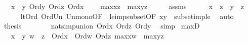 \begin{isabellebody}
\ \ \ {\isachardoublequoteopen}x\ {\isasymle}\ y{\isachardoublequoteclose}\ {\isachardoublequoteopen}Ord{\isacharparenleft}{\kern0pt}y{\isacharparenright}{\kern0pt}{\isachardoublequoteclose}\ {\isachardoublequoteopen}Ord{\isacharparenleft}{\kern0pt}z{\isacharparenright}{\kern0pt}{\isachardoublequoteclose}\ {\isachardoublequoteopen}Ord{\isacharparenleft}{\kern0pt}x{\isacharparenright}{\kern0pt}{\isachardoublequoteclose}\ \isanewline
\ \ \ {\isachardoublequoteopen}max{\isacharparenleft}{\kern0pt}x{\isacharcomma}{\kern0pt}z{\isacharparenright}{\kern0pt}\ {\isasymle}\ max{\isacharparenleft}{\kern0pt}y{\isacharcomma}{\kern0pt}z{\isacharparenright}{\kern0pt}{\isachardoublequoteclose}\isanewline
%
\isadelimproof
%
\endisadelimproof
%
\isatagproof
{}\isamarkupfalse%
\ {\isacharminus}{\kern0pt}\isanewline
\ \ \isamarkupfalse%
\ assms\ \isanewline
\ \ \isamarkupfalse%
\ {\isachardoublequoteopen}\ x\ {\isasymunion}\ z\ {\isasymle}\ y\ {\isasymunion}\ z{\isachardoublequoteclose}\isanewline
\ \ \ \ \isamarkupfalse%
\ lt{\isacharunderscore}{\kern0pt}Ord\ Ord{\isacharunderscore}{\kern0pt}Un\ Un{\isacharunderscore}{\kern0pt}mono{\isacharbrackleft}{\kern0pt}OF\ \ le{\isacharunderscore}{\kern0pt}imp{\isacharunderscore}{\kern0pt}subset{\isacharbrackleft}{\kern0pt}OF\ {\isacartoucheopen}x{\isasymle}y{\isacartoucheclose}{\isacharbrackright}{\kern0pt}{\isacharbrackright}{\kern0pt}\ \ subset{\isacharunderscore}{\kern0pt}imp{\isacharunderscore}{\kern0pt}le\ \isamarkupfalse%
\ auto\isanewline
\ \ \isamarkupfalse%
\ \isamarkupfalse%
\ {\isacharquery}{\kern0pt}thesis\ \isanewline
\ \ \ \ \isamarkupfalse%
\ \ nat{\isacharunderscore}{\kern0pt}simp{\isacharunderscore}{\kern0pt}union\ {\isacartoucheopen}Ord{\isacharparenleft}{\kern0pt}x{\isacharparenright}{\kern0pt}{\isacartoucheclose}\ {\isacartoucheopen}Ord{\isacharparenleft}{\kern0pt}z{\isacharparenright}{\kern0pt}{\isacartoucheclose}\ {\isacartoucheopen}Ord{\isacharparenleft}{\kern0pt}y{\isacharparenright}{\kern0pt}{\isacartoucheclose}\ \isamarkupfalse%
\ simp\isanewline
{}\isamarkupfalse%
%
\endisatagproof
{\isafoldproof}%
%
\isadelimproof
\isanewline
%
\endisadelimproof
\isanewline
{}\isamarkupfalse%
\ max{\isacharunderscore}{\kern0pt}D{}\ {\isacharcolon}{\kern0pt}\isanewline
\ \ \ {\isachardoublequoteopen}x\ {\isacharequal}{\kern0pt}\ y{\isachardoublequoteclose}\ {\isachardoublequoteopen}w\ {\isacharless}{\kern0pt}\ z{\isachardoublequoteclose}\ \ {\isachardoublequoteopen}Ord{\isacharparenleft}{\kern0pt}x{\isacharparenright}{\kern0pt}{\isachardoublequoteclose}\ \ {\isachardoublequoteopen}Ord{\isacharparenleft}{\kern0pt}w{\isacharparenright}{\kern0pt}{\isachardoublequoteclose}\ {\isachardoublequoteopen}Ord{\isacharparenleft}{\kern0pt}z{\isacharparenright}{\kern0pt}{\isachardoublequoteclose}\ {\isachardoublequoteopen}max{\isacharparenleft}{\kern0pt}x{\isacharcomma}{\kern0pt}w{\isacharparenright}{\kern0pt}\ {\isacharequal}{\kern0pt}\ max{\isacharparenleft}{\kern0pt}y{\isacharcomma}{\kern0pt}z{\isacharparenright}{\kern0pt}{\isachardoublequoteclose}\isanewline

\end{isabellebody}
